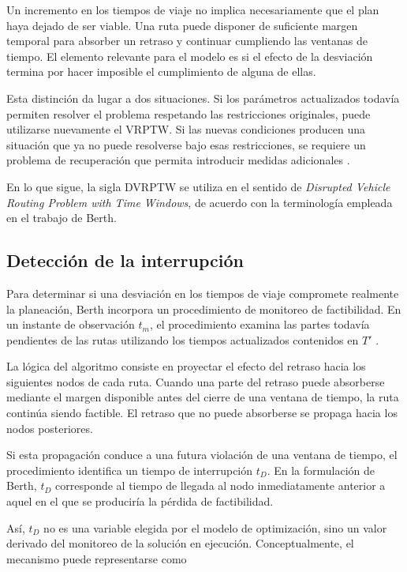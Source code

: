 \documentclass[11pt]{article}
\begin{document}
Un incremento en los tiempos de viaje no implica necesariamente que el plan haya
dejado de ser viable. Una ruta puede disponer de suficiente margen temporal para
absorber un retraso y continuar cumpliendo las ventanas de tiempo. El elemento
relevante para el modelo es si el efecto de la desviación termina por hacer imposible
el cumplimiento de alguna de ellas.

Esta distinción da lugar a dos situaciones. Si los parámetros actualizados todavía
permiten resolver el problema respetando las restricciones originales, puede utilizarse
nuevamente el VRPTW. Si las nuevas condiciones producen una situación que ya no
puede resolverse bajo esas restricciones, se requiere un problema de recuperación
que permita introducir medidas adicionales
\parencite{berth_thesis_2025}.

En lo que sigue, la sigla DVRPTW se utiliza en el sentido de
\textit{Disrupted Vehicle Routing Problem with Time Windows}, de acuerdo con la
terminología empleada en el trabajo de Berth.

\subsection{Detección de la interrupción}

Para determinar si una desviación en los tiempos de viaje compromete realmente la
planeación, Berth incorpora un procedimiento de monitoreo de factibilidad. En un
instante de observación \(t_m\), el procedimiento examina las partes todavía pendientes
de las rutas utilizando los tiempos actualizados contenidos en \(T'\)
\parencite{berth_thesis_2025}.

La lógica del algoritmo consiste en proyectar el efecto del retraso hacia los siguientes
nodos de cada ruta. Cuando una parte del retraso puede absorberse mediante el margen
disponible antes del cierre de una ventana de tiempo, la ruta continúa siendo factible.
El retraso que no puede absorberse se propaga hacia los nodos posteriores.

Si esta propagación conduce a una futura violación de una ventana de tiempo, el
procedimiento identifica un tiempo de interrupción \(t_D\). En la formulación de
Berth, \(t_D\) corresponde al tiempo de llegada al nodo inmediatamente anterior a
aquel en el que se produciría la pérdida de factibilidad.

Así, \(t_D\) no es una variable elegida por el modelo de optimización, sino un valor
derivado del monitoreo de la solución en ejecución. Conceptualmente, el mecanismo
puede representarse como
\end{document}
